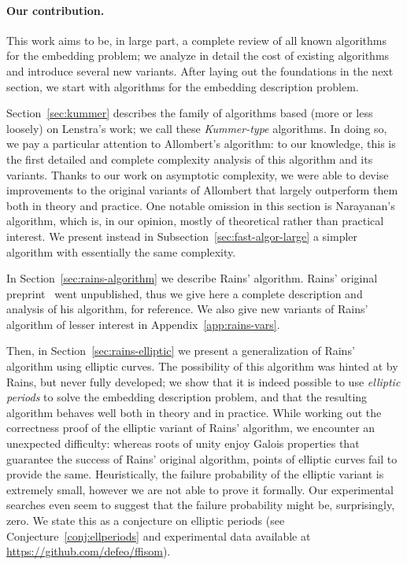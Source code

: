 \documentclass{mcom-l}
\theoremstyle{plain}
\theoremstyle{definition}
\newcounter{algorithm}
\begin{document}
\paragraph{\bf Our contribution.}
This work aims to be, in large part, a complete review of all known
algorithms for the embedding problem; we analyze in detail the cost of 
existing algorithms and introduce several new variants. %
After laying out the foundations in the next section, we start with
algorithms for the embedding description problem. %

Section~\ref{sec:kummer} describes the family of algorithms based
(more or less loosely) on Lenstra's work; we call these
\emph{Kummer-type} algorithms. %
In doing so, we pay a particular attention to Allombert's algorithm:
to our knowledge, this is the first detailed and complete complexity
analysis of this algorithm and its variants. %
Thanks to our work on asymptotic complexity, we were able to devise
improvements to the original variants of Allombert that largely
outperform them both in theory and practice. %
One notable omission in this section is Narayanan's algorithm, which
is, in our opinion, mostly of theoretical rather than practical
interest. %
We present instead in Subsection~\ref{sec:fast-algor-large} a simpler
algorithm with essentially the same complexity.

In Section~\ref{sec:rains-algorithm} we describe Rains' algorithm. %
Rains' original preprint~\cite{rains2008} went unpublished, thus we
give here a complete description and analysis of his algorithm, for
reference. %
We also give new variants of Rains' algorithm of lesser
interest in Appendix~\ref{app:rains-vars}.

Then, in Section~\ref{sec:rains-elliptic} we present a generalization
of Rains' algorithm using elliptic curves. %
The possibility of this algorithm was hinted at by Rains, but never
fully developed; we show that it is indeed possible to use
\emph{elliptic periods} to solve the embedding description problem,
and that the resulting algorithm behaves well both in theory and in
practice. %
While working out the correctness proof of the elliptic variant of
Rains' algorithm, we encounter an unexpected difficulty: whereas roots
of unity enjoy Galois properties that guarantee the success of Rains'
original algorithm, points of elliptic curves fail to provide the
same. %
Heuristically, the failure probability of the elliptic variant is
extremely small, however we are not able to prove it formally. %
Our experimental searches even seem to suggest that the failure
probability might be, surprisingly, zero. %
We state this as a conjecture on elliptic periods (see
Conjecture~\ref{conj:ellperiods} and experimental data
available at \url{https://github.com/defeo/ffisom}).
\end{document}
